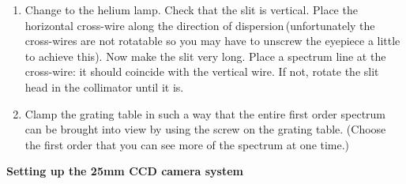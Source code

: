 \documentclass[12pt]{article}
\begin{document}
\begin{enumerate}
\item Change to the helium lamp. Check that the slit is vertical. Place the horizontal cross-wire along the direction of dispersion\,(unfortunately the cross-wires are not rotatable so you may have to  unscrew the eyepiece a little to achieve this). Now make the slit very long. Place a spectrum line at the cross-wire: it should coincide with the vertical wire. If not, rotate the slit head in the collimator until it is.

\item Clamp the grating table in such a way that the entire first order spectrum can be  brought into view by using the screw on the grating table. (Choose the first order that you can see more of the spectrum at one time.)

\end{enumerate}

\newpage




{\bf Setting up the 25mm CCD camera system}

\begin{center}
\centerline{}
\end{center}
\end{document}
